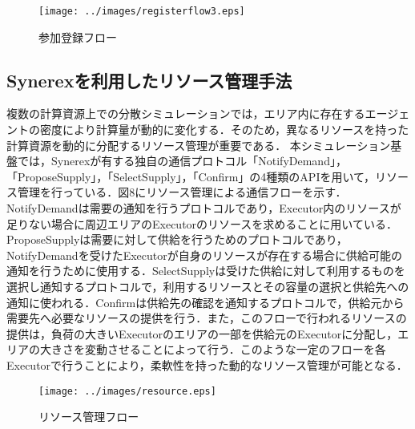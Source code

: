 \documentclass[originalpaper]{jsaiart}     %
\begin{document}
\begin{figure}[t]
    \begin{center}
        \texttt{[image: ../images/registerflow3.eps]}
    \end{center}
    \caption{参加登録フロー}
    \label{dummy}
\end{figure}




\subsection{Synerexを利用したリソース管理手法}

複数の計算資源上での分散シミュレーションでは，エリア内に存在するエージェントの密度により計算量が動的に変化する．そのため，異なるリソースを持った計算資源を動的に分配するリソース管理が重要である．
本シミュレーション基盤では，Synerexが有する独自の通信プロトコル「NotifyDemand」，「ProposeSupply」，「SelectSupply」，「Confirm」の4種類のAPIを用いて，リソース管理を行っている．図8にリソース管理による通信フローを示す．NotifyDemandは需要の通知を行うプロトコルであり，Executor内のリソースが足りない場合に周辺エリアのExecutorのリソースを求めることに用いている．ProposeSupplyは需要に対して供給を行うためのプロトコルであり，NotifyDemandを受けたExecutorが自身のリソースが存在する場合に供給可能の通知を行うために使用する．SelectSupplyは受けた供給に対して利用するものを選択し通知するプロトコルで，利用するリソースとその容量の選択と供給先への通知に使われる．Confirmは供給先の確認を通知するプロトコルで，供給元から需要先へ必要なリソースの提供を行う．また，このフローで行われるリソースの提供は，負荷の大きいExecutorのエリアの一部を供給元のExecutorに分配し，エリアの大きさを変動させることによって行う．このような一定のフローを各Executorで行うことにより，柔軟性を持った動的なリソース管理が可能となる．


\begin{figure}[t]
    \begin{center}
        \texttt{[image: ../images/resource.eps]}
    \end{center}
    \caption{リソース管理フロー}
    \label{dummy}
\end{figure}
\end{document}
